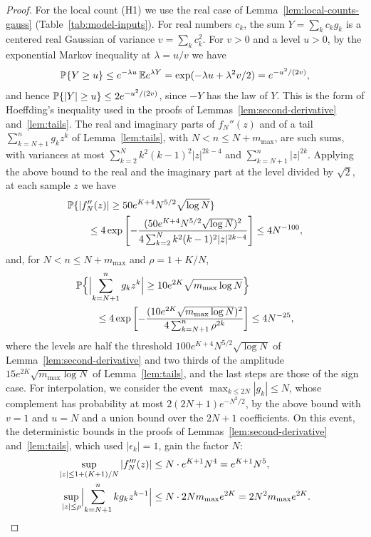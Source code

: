 \begin{proof}
For the local count (H1) we use the real case of
Lemma~\ref{lem:local-counts-gauss} (Table~\ref{tab:model-inputs}).
For real numbers $c_k$, the sum $Y=\sum_kc_kg_k$ is a centered real
Gaussian of variance $v=\sum_kc_k^2$.
For $v>0$ and a level $u>0$, by the exponential Markov inequality at
$\lambda=u/v$ we have
\[
 \mathbb P\{Y\ge u\}
 \le e^{-\lambda u}\,\mathbb Ee^{\lambda Y}
 =\exp(-\lambda u+\lambda^2v/2)
 =e^{-u^2/(2v)},
\]
and hence $\mathbb P\{|Y|\ge u\}\le2e^{-u^2/(2v)}$, since $-Y$ has the law
of $Y$.
This is the form of Hoeffding's inequality used in the proofs of
Lemmas~\ref{lem:second-derivative} and~\ref{lem:tails}.
The real and imaginary parts of $f_N''(z)$ and of a tail
$\sum_{k=N+1}^ng_kz^k$ of Lemma~\ref{lem:tails}, with
$N<n\le N+m_{\max}$, are such sums, with variances at most
$\sum_{k=2}^Nk^2(k-1)^2|z|^{2k-4}$ and $\sum_{k=N+1}^n|z|^{2k}$.
Applying the above bound to the real and the imaginary part at the level
divided by $\sqrt2$, at each sample $z$ we have
\begin{align*}
 &\mathbb P\{|f_N''(z)|\ge50e^{K+4}N^{5/2}\sqrt{\log N}\}\\
 &\qquad\le4\exp\left[-\frac{(50e^{K+4}N^{5/2}\sqrt{\log N})^2}
   {4\sum_{k=2}^Nk^2(k-1)^2|z|^{2k-4}}\right]
 \le4N^{-100},
\end{align*}
and, for $N<n\le N+m_{\max}$ and $\rho=1+K/N$,
\begin{align*}
 &\mathbb P\Bigl\{\Bigl|\sum_{k=N+1}^ng_kz^k\Bigr|
   \ge10e^{2K}\sqrt{m_{\max}\log N}\Bigr\}\\
 &\qquad\le4\exp\left[-\frac{(10e^{2K}\sqrt{m_{\max}\log N})^2}
   {4\sum_{k=N+1}^n\rho^{2k}}\right]
 \le4N^{-25},
\end{align*}
where the levels are half the threshold
$100e^{K+4}N^{5/2}\sqrt{\log N}$ of Lemma~\ref{lem:second-derivative} and
two thirds of the amplitude $15e^{2K}\sqrt{m_{\max}\log N}$ of
Lemma~\ref{lem:tails}, and the last steps are those of the sign case.
For interpolation, we consider the event $\max_{k\le2N}|g_k|\le N$,
whose complement has probability at most $2(2N+1)e^{-N^2/2}$, by the
above bound with $v=1$ and $u=N$ and a union bound over the $2N+1$
coefficients.
On this event, the deterministic bounds in the proofs of
Lemmas~\ref{lem:second-derivative} and~\ref{lem:tails}, which used
$|\epsilon_k|=1$, gain the factor $N$:
\begin{align*}
 \sup_{|z|\le1+(K+1)/N}|f_N'''(z)|&\le N\cdot e^{K+1}N^4
 =e^{K+1}N^5,\\
 \sup_{|z|\le\rho}\Bigl|\sum_{k=N+1}^nkg_kz^{k-1}\Bigr|
 &\le N\cdot2Nm_{\max}e^{2K}
 =2N^2m_{\max}e^{2K}.

\end{align*}
\end{proof}

